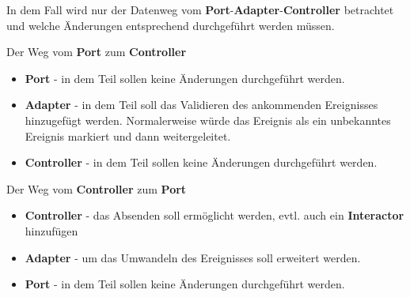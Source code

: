 In dem Fall wird nur der Datenweg vom \textbf{Port}-\textbf{Adapter}-\textbf{Controller} betrachtet und welche Änderungen
entsprechend durchgeführt werden müssen.

Der Weg vom \textbf{Port} zum \textbf{Controller}

\begin{itemize}
    \item \textbf{Port} - in dem Teil sollen keine Änderungen durchgeführt werden.
    \item \textbf{Adapter} - in dem Teil soll das Validieren des ankommenden Ereignisses hinzugefügt werden. Normalerweise würde 
    das Ereignis als ein unbekanntes Ereignis markiert und dann weitergeleitet.
    \item \textbf{Controller} - in dem Teil sollen keine Änderungen durchgeführt werden.
\end{itemize}

Der Weg vom \textbf{Controller} zum \textbf{Port}
\begin{itemize}
    \item \textbf{Controller} - das Absenden soll ermöglicht werden, evtl. auch ein \textbf{Interactor} hinzufügen
    \item \textbf{Adapter} - um das Umwandeln des Ereignisses soll erweitert werden.
    \item \textbf{Port} - in dem Teil sollen keine Änderungen durchgeführt werden.
\end{itemize}

